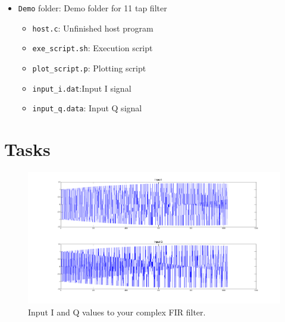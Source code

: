 \begin{itemize}
\item \texttt{Demo} folder: Demo folder for 11 tap filter
\begin{itemize}
\item \texttt{host.c}: Unfinished host program
\item \texttt{exe\_script.sh}: Execution script
\item \texttt{plot\_script.p}: Plotting script
\item \texttt{input\_i.dat}:Input I signal
\item \texttt{input\_q.data}: Input Q signal

\end{itemize}
\end{itemize}

\section{Tasks}

\begin{figure}
\centering
%
\includegraphics[width=6in]{images/IQ}
\caption{Input I and Q values to your complex FIR filter.} \label{fig:IQ}
\end{figure}

